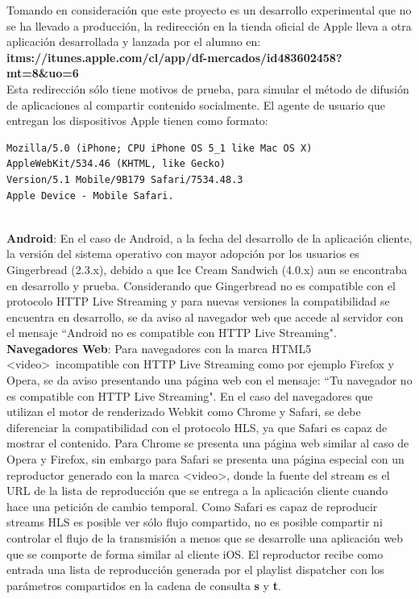 Tomando en consideración que este proyecto es un desarrollo experimental que no se ha llevado a producción, la redirección en la tienda oficial de Apple lleva a otra aplicación desarrollada y lanzada por el alumno en: \textbf{itms://itunes.apple.com/cl/app/df-mercados/id483602458?mt=8\&uo=6} \\
Esta redirección sólo tiene motivos de prueba, para simular el método de difusión de aplicaciones al compartir contenido socialmente.
El agente de usuario que entregan los dispositivos Apple tienen como formato: 
	\begin {lstlisting}
Mozilla/5.0 (iPhone; CPU iPhone OS 5_1 like Mac OS X) 
AppleWebKit/534.46 (KHTML, like Gecko) 
Version/5.1 Mobile/9B179 Safari/7534.48.3
Apple Device - Mobile Safari.
\end{lstlisting} 
~\\ %

\textbf{Android}: En el caso de Android, a la fecha del desarrollo de la aplicación cliente, la versión del sistema operativo con mayor adopción por los usuarios es Gingerbread (2.3.x), debido a que Ice Cream Sandwich (4.0.x) aun se encontraba en desarrollo y prueba. Considerando que Gingerbread no es compatible con el protocolo HTTP Live Streaming y para nuevas versiones la compatibilidad se encuentra en desarrollo, se da aviso al navegador web que accede al servidor con el mensaje \textquotedblleft Android no es compatible con HTTP Live Streaming".\\

\textbf{Navegadores Web}:
Para navegadores con la marca HTML5 \textless video\textgreater \ incompatible con HTTP Live Streaming como por ejemplo Firefox y Opera, se da aviso presentando una página web con el mensaje: \textquotedblleft Tu navegador no es compatible con HTTP Live Streaming".
En el caso del navegadores que utilizan el motor de renderizado Webkit como Chrome y Safari, se debe diferenciar la compatibilidad con el protocolo HLS, ya que Safari es capaz de mostrar el contenido. Para Chrome se presenta una página web similar al caso de Opera y Firefox, sin embargo para Safari se presenta una página especial con un reproductor generado con la marca \textless video\textgreater , donde la fuente del stream es el URL de la lista de reproducción que se entrega a la aplicación cliente cuando hace una petición de cambio temporal. Como Safari es capaz de reproducir streams HLS es posible ver sólo flujo compartido, no es posible compartir ni controlar el flujo de la transmisión a menos que se desarrolle una aplicación web que se comporte de forma similar al cliente iOS.
El reproductor recibe como entrada una lista de reproducción generada por el playlist dispatcher con los parámetros compartidos en la cadena de consulta \textbf{s} y \textbf{t}.



		
		